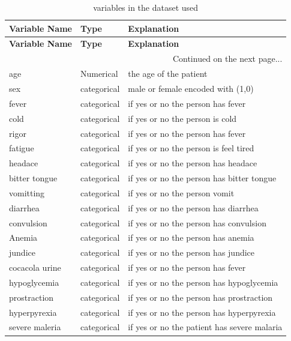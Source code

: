 \documentclass[12pt,a4paper]{article}
\begin{document}
	
	\begin{longtable}{lll}
		\caption{variables in the dataset used} \\
		\toprule
		\textbf{Variable Name} & \textbf{Type} & \textbf{Explanation} \\ 
		\midrule
		\endfirsthead
		
		\toprule
		\textbf{Variable Name} & \textbf{Type} & \textbf{Explanation} \\ 
		\midrule
		\endhead
		
		\midrule
		\multicolumn{3}{r}{Continued on the next page...} \\
		\midrule
		\endfoot
		
		\bottomrule
		\endlastfoot
		
		age & Numerical & the age of the patient \\
		sex & categorical &  male or female encoded  with (1,0)\\
		fever & categorical & if yes or no the person has fever \\
		cold & categorical & if yes or no the person is cold \\
		rigor & categorical & if yes or no the person has fever \\
		fatigue & categorical & if yes or no the person is feel tired \\
		headace & categorical & if yes or no the person has headace \\
		bitter tongue & categorical & if yes or no the person has bitter tongue \\
		vomitting & categorical & if yes or no the person vomit \\
		diarrhea & categorical & if yes or no the person has diarrhea \\
		convulsion & categorical & if yes or no the person has convulsion \\
		Anemia & categorical & if yes or no the person has anemia \\
		jundice & categorical & if yes or no the person has jundice \\
		cocacola urine & categorical & if yes or no the person has fever \\
		hypoglycemia & categorical & if yes or no the person has hypoglycemia \\
		prostraction & categorical & if yes or no the person has prostraction \\
		hyperpyrexia & categorical & if yes or no the person has hyperpyrexia \\
		severe maleria & categorical & if yes or no the patient has severe malaria \\
		
		
	\end{longtable}
\end{document}

